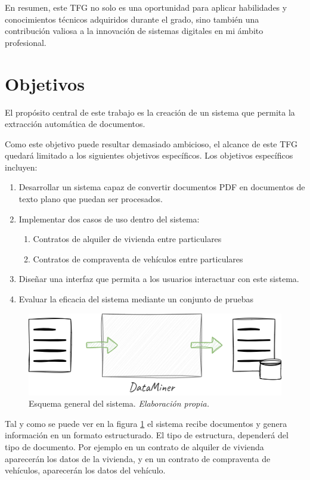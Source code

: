 En resumen, este TFG no solo es una oportunidad para aplicar habilidades y conocimientos técnicos adquiridos durante el
grado, sino también una contribución valiosa a la innovación de sistemas digitales en mi ámbito profesional.


\section{Objetivos}

El propósito central de este trabajo es la creación de un sistema que permita la extracción automática de documentos.

Como este objetivo puede resultar demasiado ambicioso, el alcance de este TFG quedará limitado a los siguientes
objetivos específicos.
Los objetivos específicos incluyen:

\begin{enumerate}
    \item
    Desarrollar un sistema capaz de convertir documentos PDF en documentos de texto plano que puedan ser procesados.
    \item Implementar dos casos de uso dentro del sistema:
    \begin{enumerate}
        \item Contratos de alquiler de vivienda entre particulares
        \item Contratos de compraventa de vehículos entre particulares
    \end{enumerate}
    \item Diseñar una interfaz que permita a los usuarios interactuar con este sistema.
    \item Evaluar la eficacia del sistema mediante un conjunto de pruebas
\end{enumerate}

\begin{figure}[ht]
    \begin{center}
        \includegraphics[scale=0.5]{./chapter/images/chapter_1.overview}
        \caption{Esquema general del sistema. \textit{Elaboración propia.}}
        \label{fig:chapter_1.overview}
    \end{center}
\end{figure}


Tal y como se puede ver en la figura \ref{fig:chapter_1.overview}
el sistema recibe documentos y genera información en un formato estructurado.
El tipo de estructura, dependerá del tipo de documento.
Por ejemplo en un contrato de alquiler de vivienda aparecerán los datos de la vivienda, y en un contrato de compraventa
de vehículos, aparecerán los datos del vehículo.
